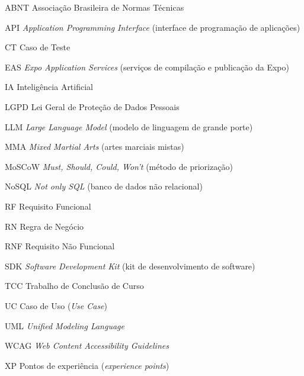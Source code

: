 \begin{siglas}
  \item[ABNT] Associação Brasileira de Normas Técnicas
  \item[API] \textit{Application Programming Interface} (interface de programação de aplicações)
  \item[CT] Caso de Teste
  \item[EAS] \textit{Expo Application Services} (serviços de compilação e publicação da Expo)
  \item[IA] Inteligência Artificial
  \item[LGPD] Lei Geral de Proteção de Dados Pessoais
  \item[LLM] \textit{Large Language Model} (modelo de linguagem de grande porte)
  \item[MMA] \textit{Mixed Martial Arts} (artes marciais mistas)
  \item[MoSCoW] \textit{Must, Should, Could, Won't} (método de priorização)
  \item[NoSQL] \textit{Not only SQL} (banco de dados não relacional)
  \item[RF] Requisito Funcional
  \item[RN] Regra de Negócio
  \item[RNF] Requisito Não Funcional
  \item[SDK] \textit{Software Development Kit} (kit de desenvolvimento de software)
  \item[TCC] Trabalho de Conclusão de Curso
  \item[UC] Caso de Uso (\textit{Use Case})
  \item[UML] \textit{Unified Modeling Language}
  \item[WCAG] \textit{Web Content Accessibility Guidelines}
  \item[XP] Pontos de experiência (\textit{experience points})
\end{siglas}

